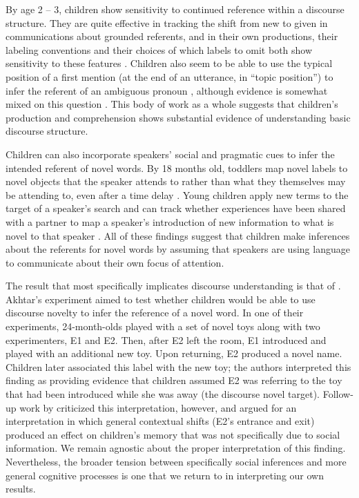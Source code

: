 \documentclass[man]{apa2}
\begin{document}
By age 2 -- 3, children show sensitivity to continued reference within a discourse structure.  They are quite effective in tracking the shift from new to given in communications about grounded referents, and in their own productions, their labeling conventions and their choices of which labels to omit both show sensitivity to these features \cite{allen2000, bates1976, greenfield1976, clancy2004, skarabela2007}.  Children also seem to be able to use the typical position of a first mention (at the end of an utterance, in ``topic position'') to infer the referent of an ambiguous pronoun \cite{song2005, song2007, pyykkonen2010}, although evidence is somewhat mixed on this question \cite{arnold2007}. This body of work as a whole suggests that children's production and comprehension shows substantial evidence of understanding basic discourse structure.

Children can also incorporate speakers' social and pragmatic cues to infer the intended referent of novel words. By 18 months old, toddlers map novel labels to novel objects that the speaker attends to rather than what they themselves may be attending to, even after a time delay \cite{baldwin1991,baldwin1993}.  Young children apply new terms to the target of a speaker's search \cite{tomasello1994} and can track whether experiences have been shared with a partner to map a speaker's introduction of new information to what is novel to that speaker \cite{akhtar1996}. All of these findings suggest that children make inferences about the referents for novel words by assuming that speakers are using language to communicate about their own focus of attention. 

The result that most specifically implicates discourse understanding is that of . Akhtar's experiment aimed to test whether children would be able to use discourse novelty to infer the reference of a novel word. In one of their experiments, 24-month-olds played with a set of novel toys along with two experimenters, E1 and E2. Then, after E2 left the room, E1 introduced and played with an additional new toy. Upon returning, E2 produced a novel name. Children later associated this label with the new toy; the authors interpreted this finding as providing evidence that children assumed E2 was referring to the toy that had been introduced while she was away (the discourse novel target). Follow-up work by  criticized this interpretation, however, and argued for an interpretation in which general contextual shifts (E2's entrance and exit) produced an effect on children's memory that was not specifically due to social information. We remain agnostic about the proper interpretation of this finding. Nevertheless, the broader tension between specifically social inferences and more general cognitive processes is one that we return to in interpreting our own results.
\end{document}
